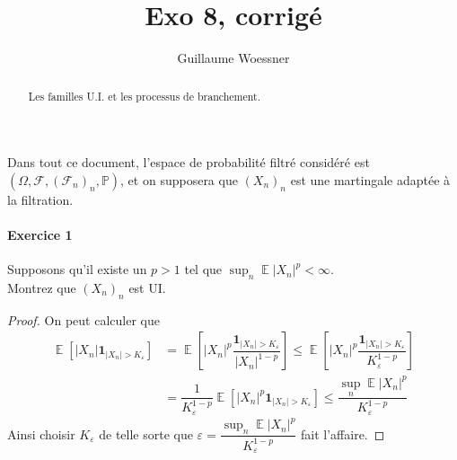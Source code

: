 \documentclass{article}
\title{Exo 8, corrigé}
\author{Guillaume Woessner}
\date{}                       %
\theoremstyle{definition}
\numberwithin{equation}{section}
\DeclareMathOperator{\E}{\mathbb{E}}
\begin{document}
\maketitle                    %

\begin{abstract}
\begin{center}
Les familles U.I. et les processus de branchement.
\end{center}
\end{abstract}



Dans tout ce document, l'espace de probabilité filtré considéré est $(\Omega,\mathcal{F},(\mathcal{F}_n)_n,\mathbb{P})$, et on supposera que $(X_n)_n$ est une martingale adaptée à la filtration.






\paragraph{Exercice 1}
Supposons qu'il existe un $p>1$ tel que $\sup_n\E|X_n|^p<\infty$.\\
Montrez que $(X_n)_n$ est UI.

\begin{proof}
 On peut calculer que 
 \begin{align*}
 \E[|X_n|\mathbf{1}_{|X_n|>K_\varepsilon}] &= \E\left[|X_n|^p \dfrac{\mathbf{1}_{|X_n|>K_\varepsilon}}{|X_n|^{1-p}}\right]\leq \E\left[|X_n|^p \dfrac{\mathbf{1}_{|X_n|>K_\varepsilon}}{K_\varepsilon^{1-p}}\right]\\
 &=  \dfrac{1}{K_\varepsilon^{1-p}}\E[|X_n|^p\mathbf{1}_{|X_n|>K_\varepsilon}] \leq \dfrac{\sup_n\E|X_n|^p}{K_\varepsilon^{1-p}} 
 \end{align*}
 Ainsi choisir $K_\varepsilon$ de telle sorte que $\varepsilon= \dfrac{\sup_n\E|X_n|^p}{K_\varepsilon^{1-p}} $ fait l'affaire.
\end{proof}
\end{document}

